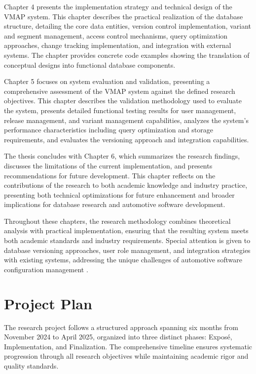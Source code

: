 Chapter 4 presents the implementation strategy and technical design of the VMAP system. This chapter describes the practical realization of the database structure, detailing the core data entities, version control implementation, variant and segment management, access control mechanisms, query optimization approaches, change tracking implementation, and integration with external systems. The chapter provides concrete code examples showing the translation of conceptual designs into functional database components.

Chapter 5 focuses on system evaluation and validation, presenting a comprehensive assessment of the VMAP system against the defined research objectives. This chapter describes the validation methodology used to evaluate the system, presents detailed functional testing results for user management, release management, and variant management capabilities, analyzes the system's performance characteristics including query optimization and storage requirements, and evaluates the versioning approach and integration capabilities.

The thesis concludes with Chapter 6, which summarizes the research findings, discusses the limitations of the current implementation, and presents recommendations for future development. This chapter reflects on the contributions of the research to both academic knowledge and industry practice, presenting both technical optimizations for future enhancement and broader implications for database research and automotive software development.

Throughout these chapters, the research methodology combines theoretical analysis with practical implementation, ensuring that the resulting system meets both academic standards and industry requirements. Special attention is given to database versioning approaches, user role management, and integration strategies with existing systems, addressing the unique challenges of automotive software configuration management \cite{staron2021automotive}.

\section{Project Plan}

The research project follows a structured approach spanning six months from November 2024 to April 2025, organized into three distinct phases: Exposé, Implementation, and Finalization. The comprehensive timeline ensures systematic progression through all research objectives while maintaining academic rigor and quality standards.

